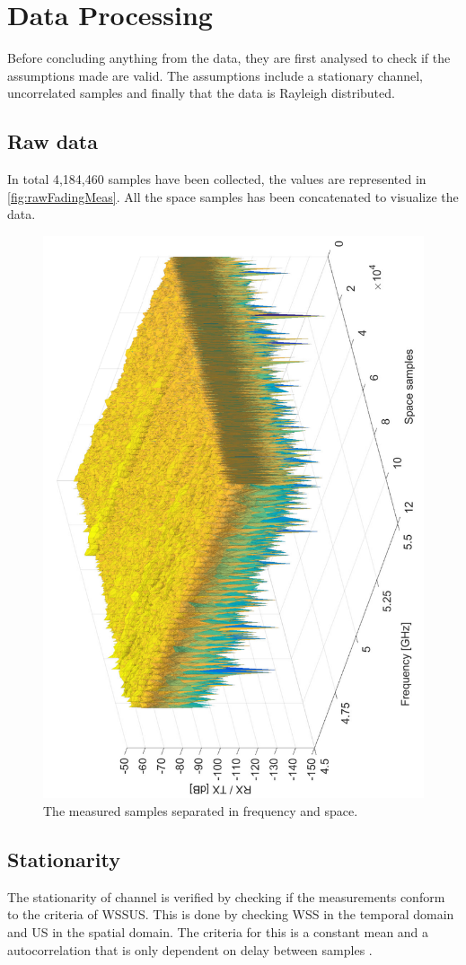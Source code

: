 \section{Data Processing}

Before concluding anything from the data, they are first analysed to check if the assumptions made are valid. The assumptions include a stationary channel, uncorrelated samples and finally that the data is Rayleigh distributed.

\subsection{Raw data}

In total 4,184,460 samples have been collected, the values are represented in \autoref{fig:rawFadingMeas}. All the space samples has been concatenated to visualize the data.

\begin{figure}[H]
\centering
\includegraphics[height = \textwidth, angle = -90]{figures/rawFadingMeas.pdf}
\caption{The measured samples separated in frequency and space.}
\label{fig:rawFadingMeas}
\end{figure}


\subsection{Stationarity}\label{sec:meas_stationarity}
The stationarity of channel is verified by checking if the measurements conform to the criteria of \gls{WSSUS}. This is done by checking \gls{WSS} in the temporal domain and \gls{US} in the spatial domain. The criteria for this is a constant mean and a autocorrelation that is only dependent on delay between samples \citep[ch. 5]{The_Mobile_Radio_Propagation_Channelbook}. 

